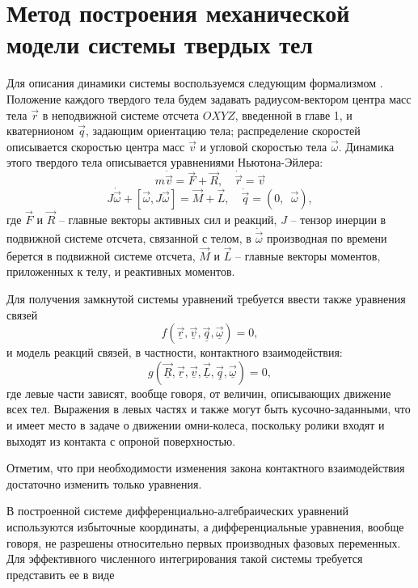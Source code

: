 \section{Метод построения механической модели системы твердых тел}

Для описания динамики системы воспользуемся следующим формализмом \cite{Kosenko2006,Kosenko2007,KosenkoQuaternionRus}. Положение каждого твердого тела будем задавать радиусом-вектором центра масс тела $\vec{r}$ в неподвижной системе отсчета $OXYZ$, введенной в главе 1, и кватернионом $\vec{q}$, задающим ориентацию тела; распределение скоростей описывается скоростью центра масс $\vec{v}$ и угловой скоростью тела $\vec{\omega}$.
Динамика этого твердого тела описывается уравнениями Ньютона-Эйлера:
$$ m\dot{\vec{v}} = \vec{F} + \vec{R}, \quad \dot{\vec{r}} = \vec{v} $$
$$ J\dot{\vec{\omega}} + [ \vec{\omega}, J\vec{\omega} ] = \vec{M} + \vec{L}, \quad \dot{\vec{q}} = (0, \enspace \vec{\omega}), $$
где $\vec{F}$ и $\vec{R}$ -- главные векторы активных сил и реакций, $J$ -- тензор инерции в подвижной системе отсчета, связанной с телом, в $\dot{\vec{\omega}}$ производная по времени берется в подвижной системе отсчета, $\vec{M}$ и $\vec{L}$ -- главные векторы моментов, приложенных к телу, и реактивных моментов.

Для получения замкнутой системы уравнений требуется ввести также уравнения связей 
\begin{equation}\label{eq:mo_cstr}
    f(\vec{\underline{r}}, \vec{\underline{v}}, \vec{\underline{q}}, \vec{\underline{\omega}}) = 0,
\end{equation}
и модель реакций связей, в частности, контактного взаимодействия:
\begin{equation}\label{eq:mo_reac}
    g(\vec{\underline{R}}, \vec{\underline{r}}, \vec{\underline{v}}, \vec{\underline{L}}, \vec{\underline{q}}, \vec{\underline{\omega}}) = 0,
\end{equation}
где левые части зависят, вообще говоря, от величин, описывающих движение всех тел. Выражения в левых частях и также могут быть кусочно-заданными, что и имеет место в задаче о движении омни-колеса, поскольку ролики входят и выходят из контакта с опроной поверхностью.

Отметим, что при необходимости изменения закона контактного взаимодействия достаточно изменить только уравнения.

В построенной системе дифференциально-алгебраических уравнений используются избыточные координаты, а дифференциальные уравнения, вообще говоря, не разрешены относительно первых производных фазовых переменных. Для эффективного численного интегрирования такой системы требуется \cite{kosenkoBook2012modelirovanie} представить ее в виде

